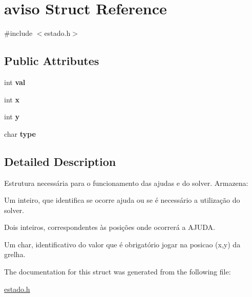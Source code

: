 \hypertarget{structaviso}{\section{aviso Struct Reference}
\label{structaviso}
}


{\ttfamily \#include $<$estado.\+h$>$}

\subsection*{Public Attributes}
\begin{DoxyCompactItemize}
\item 
\hypertarget{structaviso_a2e9ec4056f2837c6000de814de0a0d6a}{int {\bfseries val}}\label{structaviso_a2e9ec4056f2837c6000de814de0a0d6a}

\item 
\hypertarget{structaviso_a640a136115ba32a71c065fdfcd900970}{int {\bfseries x}}\label{structaviso_a640a136115ba32a71c065fdfcd900970}

\item 
\hypertarget{structaviso_abb0498906d6947cd370cc09901c3df9e}{int {\bfseries y}}\label{structaviso_abb0498906d6947cd370cc09901c3df9e}

\item 
\hypertarget{structaviso_a406f1ebc44eb76937f4829647e4cb2f6}{char {\bfseries type}}\label{structaviso_a406f1ebc44eb76937f4829647e4cb2f6}

\end{DoxyCompactItemize}


\subsection{Detailed Description}
Estrutura necessária para o funcionamento das ajudas e do solver. Armazena\+:
\begin{DoxyItemize}
\item Um inteiro, que identifica se ocorre ajuda ou se é necessário a utilização do solver.
\item Dois inteiros, correspondentes às posições onde ocorrerá a A\+J\+U\+D\+A.
\item Um char, identificativo do valor que é obrigatório jogar na posicao (x,y) da grelha. 
\end{DoxyItemize}

The documentation for this struct was generated from the following file\+:\begin{DoxyCompactItemize}
\item 
\hyperlink{estado_8h}{estado.\+h}\end{DoxyCompactItemize}

